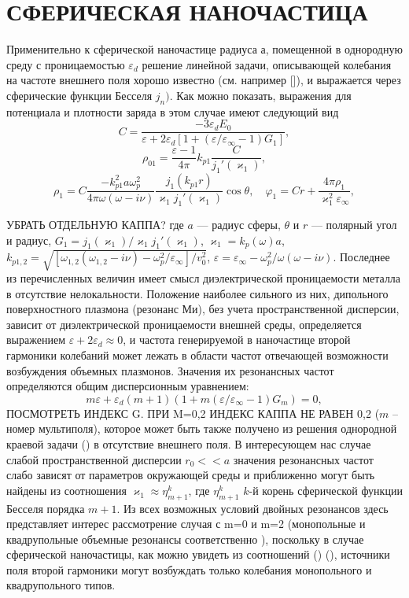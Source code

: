 \documentclass[12pt, a4paper]{article}
\def \eps {\varepsilon}
\def \w {\omega}
\def \ph {\varphi}
\def \kp { \varkappa}
\begin{document}
\section{СФЕРИЧЕСКАЯ НАНОЧАСТИЦА}
Применительно к сферической наночастице радиуса а, помещенной в однородную среду с проницаемостью $\eps_d$ решение линейной задачи, описывающей колебания на частоте внешнего поля хорошо известно (см. например []), и выражается через сферические функции Бесселя $j_n)$. Как можно показать, выражения для потенциала и плотности заряда в этом случае имеют следующий вид
\begin{equation} 
	C= \frac{-3\eps_d E_0}{\eps + 2\eps_d [1 + (\eps/\eps_\infty - 1) G_1 ]},  
\end{equation}
\begin{equation} 
\rho_{01} = \frac{\eps -1}{4\pi}k_{p1}\frac{C}{j_1' (\kp_1)}, 	
\end{equation}
\begin{equation} 
	\rho_1 = C \frac{-k_{p1}^2a\w_p^2}{4\pi\w(\w - i \nu) } \frac{j_1(k_{p1} r)}{\kp_1 j_1' (\kp_1)}\cos\theta, \quad \ph_1 = C r + \frac{4\pi \rho_1 }{\kp_1^2 \eps_\infty},
\end{equation}

УБРАТЬ ОТДЕЛЬНУЮ КАППА?
где $a$ — радиус сферы, $\theta$ и $r$  — полярный угол и радиус, $G_1 ={j_1(\kp_1)}/{\kp_1 j_1'(\kp_1)}$, $\kp_1= k_p(\omega)a$, $k_{p1,2} = \sqrt{[\w_{1,2}(\w_{1,2} - i\nu) - \w_p^2/\eps_\infty]/v_0^2} $, $\eps = \eps_\infty - {\w_p^2}/{\w(\w - i\nu)}$. Последнее из перечисленных величин имеет смысл диэлектрической проницаемости металла в отсутствие нелокальности. 
Положение наиболее сильного из них, дипольного поверхностного плазмона (резонанс Ми), без учета пространственной дисперсии, зависит от диэлектрической проницаемости внешней среды, определяется выражением $ \eps + 2\eps_d \approx 0$, и частота генерируемой в наночастице второй гармоники колебаний может лежать в области частот отвечающей возможности возбуждения объемных плазмонов. Значения их резонансных частот определяются общим дисперсионным уравнением:
\begin{equation} 	
m \eps + \eps_d(m+1)(1 + m (\eps/\eps_\infty - 1) G_m) = 0,	
\end{equation}
ПОСМОТРЕТЬ ИНДЕКС G. ПРИ M=0,2 ИНДЕКС КАППА НЕ РАВЕН 0,2
($m$ – номер мультиполя), которое может быть также получено из решения однородной краевой задачи () в отсутствие внешнего поля. В интересующем нас случае слабой пространственной дисперсии $r_0 << a$ значения резонансных частот слабо зависят от параметров окружающей среды и приближенно могут быть найдены из соотношения $ \kp_1 \approx \eta_{m+1}^k$, где $\eta_{m+1}^k$ $k$-й корень сферической функции Бесселя порядка $m+1$.	Из всех возможных условий двойных резонансов здесь представляет интерес рассмотрение случая с m=0 и m=2 (монопольные и квадрупольные объемные резонансы соответственно ), поскольку в случае сферической наночастицы, как можно увидеть из соотношений () (), источники поля второй гармоники могут возбуждать только колебания монопольного и квадрупольного типов. 
\end{document}
